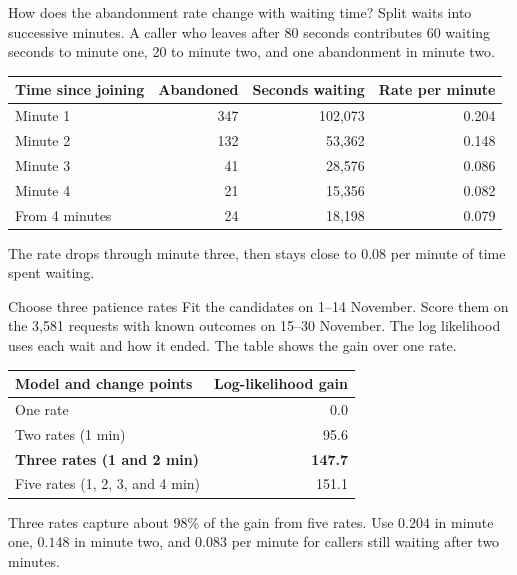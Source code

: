 \documentclass{beamer}
\begin{document}
\begin{frame}{How does the abandonment rate change with waiting time?}
  \small
  Split waits into successive minutes. A caller who leaves after 80 seconds
  contributes 60 waiting seconds to minute one, 20 to minute two, and one
  abandonment in minute two.

  \vspace{0.6em}
  \centering
  \begin{tabular}{@{}lrrr@{}}
    \toprule
    Time since joining & Abandoned & Seconds waiting & Rate per minute\\
    \midrule
    Minute 1 & 347 & 102,073 & 0.204\\
    Minute 2 & 132 & 53,362 & 0.148\\
    Minute 3 &  41 & 28,576 & 0.086\\
    Minute 4 &  21 & 15,356 & 0.082\\
    From 4 minutes & 24 & 18,198 & 0.079\\
    \bottomrule
  \end{tabular}

  \vspace{0.65em}
  \raggedright
  The rate drops through minute three, then stays close to
  0.08 per minute of time spent waiting.
\end{frame}

\begin{frame}{Choose three patience rates}
  \small
  Fit the candidates on 1--14 November. Score them on the 3,581
  requests with known outcomes on 15--30 November.
  The log likelihood uses each wait and how it ended. The table shows
  the gain over one rate.

  \vspace{0.55em}
  \centering
  \begin{tabular}{@{}lr@{}}
    \toprule
    Model and change points & Log-likelihood gain\\
    \midrule
    One rate & 0.0\\
    Two rates (1 min) & 95.6\\
    \textbf{Three rates (1 and 2 min)} & \textbf{147.7}\\
    Five rates (1, 2, 3, and 4 min) & 151.1\\
    \bottomrule
  \end{tabular}

  \vspace{0.55em}
  \raggedright
  Three rates capture about 98\% of the gain from five rates.
  Use $0.204$ in minute one, $0.148$ in minute two, and $0.083$
  per minute for callers still waiting after two minutes.
\end{frame}
\end{document}
